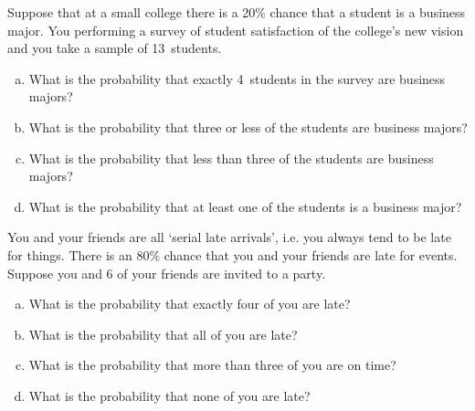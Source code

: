 \documentclass[11pt,letterpaper]{article}
\begin{document}

 Suppose that at a small college there is a 20\% chance that a student is a business major. You performing a survey of student satisfaction of the college's new vision and you take a sample of 13~students.
	\begin{enumerate}[(a)]
	\item What is the probability that exactly 4~students in the survey are business majors?
	\item What is the probability that three or less of the students are business majors?
	\item What is the probability that less than three of the students are business majors?
	\item What is the probability that at least one of the students is a business major?
	\end{enumerate}



\newpage



 You and your friends are all `serial late arrivals', i.e. you always tend to be late for things. There is an 80\% chance that you and your friends are late for events. Suppose you and 6 of your friends are invited to a party.
	\begin{enumerate}[(a)]
	\item What is the probability that exactly four of you are late?
	\item What is the probability that all of you are late?
	\item What is the probability that more than three of you are on time?
	\item What is the probability that none of you are late?
	\end{enumerate} 
\end{document}
